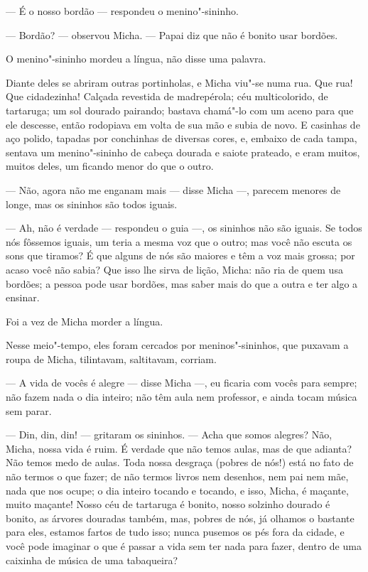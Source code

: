--- É o nosso bordão --- respondeu o menino"-sininho.

--- Bordão? --- observou Micha. --- Papai diz que não é bonito usar
bordões.

O menino"-sininho mordeu a língua, não disse uma palavra.

Diante deles se abriram outras portinholas, e Micha viu"-se numa rua. Que
rua! Que cidadezinha! Calçada revestida de madrepérola; céu
multicolorido, de tartaruga; um sol dourado pairando; bastava
chamá"-lo com um aceno para que ele descesse, então rodopiava em volta de
sua mão e subia de novo. E casinhas de aço polido, tapadas por
conchinhas de diversas cores, e, embaixo de cada tampa, sentava um
menino"-sininho de cabeça dourada e saiote prateado, e eram muitos, muitos
deles, um ficando menor do que o outro.

--- Não, agora não me enganam mais --- disse Micha ---, parecem menores
de longe, mas os sininhos são todos iguais.

--- Ah, não é verdade --- respondeu o guia ---, os sininhos não são
iguais. Se todos nós fôssemos iguais, um teria a mesma voz que o outro;
mas você não escuta os sons que tiramos? É que alguns de nós são maiores
e têm a voz mais grossa; por acaso você não sabia? Que isso lhe sirva de
lição, Micha: não ria de quem usa bordões; a pessoa pode usar bordões,
mas saber mais do que a outra e ter algo a ensinar.

Foi a vez de Micha morder a língua.

Nesse meio"-tempo, eles foram cercados por meninos"-sininhos, que puxavam a
roupa de Micha, tilintavam, saltitavam, corriam.

--- A vida de vocês é alegre --- disse Micha ---, eu ficaria com vocês
para sempre; não fazem nada o dia inteiro; não têm aula nem professor, e
ainda tocam música sem parar.

--- Din, din, din! --- gritaram os sininhos. --- Acha que somos alegres?
Não, Micha, nossa vida é ruim. É verdade que não temos aulas, mas de que
adianta? Não temos medo de aulas. Toda nossa desgraça (pobres de nós!)
está no fato de não termos o que fazer; de não termos livros nem
desenhos, nem pai nem mãe, nada que nos ocupe; o dia inteiro tocando e
tocando, e isso, Micha, é maçante, muito maçante! Nosso céu de tartaruga
é bonito, nosso solzinho dourado é bonito, as árvores douradas também,
mas, pobres de nós, já olhamos o bastante para eles, estamos fartos de
tudo isso; nunca pusemos os pés fora da cidade, e você pode imaginar o
que é passar a vida sem ter nada para fazer, dentro de uma caixinha de
música de uma tabaqueira?

